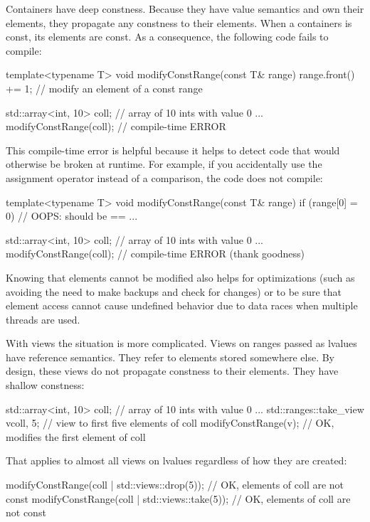 
Containers have deep constness. Because they have value semantics and own their elements, they propagate any constness to their elements. When a containers is const, its elements are const. As a consequence, the following code fails to compile:

\begin{cpp}
template<typename T>
void modifyConstRange(const T& range)
{
	range.front() += 1; // modify an element of a const range
}

std::array<int, 10> coll{}; // array of 10 ints with value 0
...
modifyConstRange(coll); // compile-time ERROR
\end{cpp}

This compile-time error is helpful because it helps to detect code that would otherwise be broken at runtime. For example, if you accidentally use the assignment operator instead of a comparison, the code does not compile:

\begin{cpp}
template<typename T>
void modifyConstRange(const T& range)
{
	if (range[0] = 0) { // OOPS: should be ==
		...
	}
}

std::array<int, 10> coll{}; // array of 10 ints with value 0
...
modifyConstRange(coll); // compile-time ERROR (thank goodness)
\end{cpp}

Knowing that elements cannot be modified also helps for optimizations (such as avoiding the need to make backups and check for changes) or to be sure that element access cannot cause undefined behavior due to data races when multiple threads are used.

With views the situation is more complicated. Views on ranges passed as lvalues have reference semantics. They refer to elements stored somewhere else. By design, these views do not propagate constness to their elements. They have shallow constness:

\begin{cpp}
std::array<int, 10> coll{}; // array of 10 ints with value 0
...
std::ranges::take_view v{coll, 5}; // view to first five elements of coll
modifyConstRange(v); // OK, modifies the first element of coll
\end{cpp}

That applies to almost all views on lvalues regardless of how they are created:

\begin{cpp}
modifyConstRange(coll | std::views::drop(5)); // OK, elements of coll are not const
modifyConstRange(coll | std::views::take(5)); // OK, elements of coll are not const
\end{cpp}


